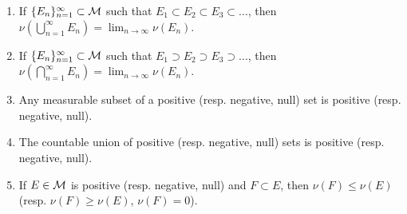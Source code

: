 \begin{proposition}\label{prop:properties-of-signed-measures}
    \phantom{a}
    \begin{enumerate}[label = (\arabic*),itemsep=1pt,topsep=3pt]
        \item If $\{E_n\}_{n=1}^\infty \subset \mathcal{M}$ such that $E_1 \subset E_2 \subset E_3 \subset ...$, then $\nu \left( \bigcup_{n = 1}^\infty E_n \right) = \lim_{n \rightarrow \infty}\nu(E_n)$.
        \item If $\{E_n\}_{n=1}^\infty \subset \mathcal{M}$ such that $E_1 \supset E_2 \supset E_3 \supset ...$, then $\nu \left( \bigcap_{n = 1}^\infty E_n \right) = \lim_{n \rightarrow \infty}\nu(E_n)$.
        \item Any measurable subset of a positive (resp. negative, null) set is positive (resp. negative, null).
        \item The countable union of positive (resp. negative, null) sets is positive (resp. negative, null).
        \item If $E \in \mathcal{M}$ is positive (resp. negative, null) and $F \subset E$, then $\nu(F) \leq \nu(E)$ (resp. $\nu(F) \geq \nu(E)$, $\nu(F) = 0$).
    \end{enumerate}
\end{proposition}

